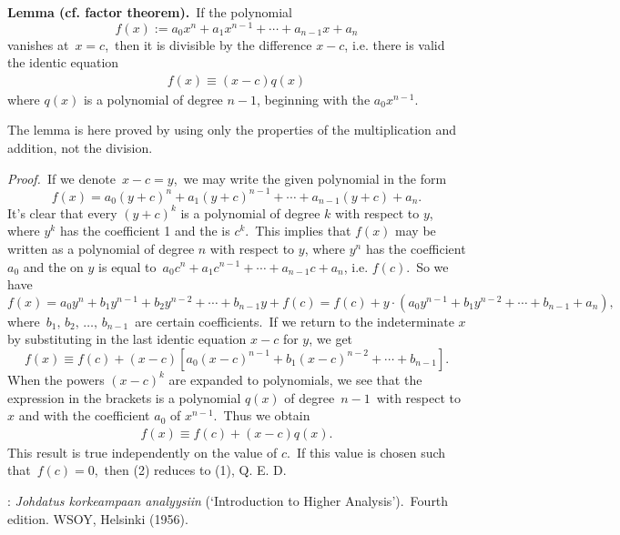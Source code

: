 \documentclass[12pt]{article}
\theoremstyle{definition}
\begin{document}
\textbf{Lemma (cf. factor theorem).}\, If the polynomial 
    $$f(x) := a_0x^n\!+\!a_1x^{n-1}\!+\cdots+\!a_{n-1}x\!+\!a_n$$
vanishes at\, $x = c$,\, then it is divisible by the difference $x\!-\!c$, i.e. there is valid the identic equation
\begin{align}
    f(x) \equiv (x\!-\!c)q(x)
\end{align}
where $q(x)$ is a polynomial of degree $n\!-\!1$, beginning with the  $a_0x^{n-1}$.

The lemma is here proved by using only the properties of the multiplication and addition, not the division.

{\em Proof.}\, If we denote\, $x\!-\!c = y$,\, we may write the given polynomial in the form
$$f(x) = 
a_0(y\!+\!c)^n\!+\!a_1(y\!+\!c)^{n-1}\!+\cdots+\!a_{n-1}(y\!+\!c)\!+\!a_n.$$
It's clear that every $(y\!+\!c)^k$ is a polynomial of degree $k$ with respect to $y$, where $y^k$ has the coefficient 1 and the  is $c^k$.\, This implies that $f(x)$ may be written as a polynomial of degree $n$ with respect to $y$, where $y^n$ has the coefficient $a_0$ and the  on $y$ is equal to\, $ a_0c^n\!+\!a_1c^{n-1}\!+\cdots+\!a_{n-1}c\!+\!a_n$, i.e. $f(c)$.\, So we have
 $$f(x) = a_0y^n\!+\!b_1y^{n-1}\!+\!b_2y^{n-2}\!+\cdots+\!b_{n-1}y\!+f(c)
      = f(c)+y\cdot(a_0y^{n-1}\!+\!b_1y^{n-2}\!+\cdots+\!b_{n-1}\!+\!a_n),$$
where\, $b_1,\,b_2,\,\ldots,\,b_{n-1}$\, are certain coefficients.\, If we return to the indeterminate $x$ by substituting in the last identic equation $x\!-\!c$ for $y$, we get
 $$f(x) \equiv f(c)+(x\!-\!c)[a_0(x\!-\!c)^{n-1}\!+\!b_1(x\!-\!c)^{n-2}\!+\cdots+\!b_{n-1}].$$
When the powers $(x\!-\!c)^k$ are expanded to polynomials, we see that the expression in the brackets is a polynomial $q(x)$ of degree\, $n\!-\!1$\, with respect to $x$ and with the coefficient $a_0$ of $x^{n-1}$.\, Thus we obtain
\begin{align}
   f(x) \equiv f(c)+(x\!-\!c)q(x).
\end{align}
This result is true independently on the value of $c$.\, If this value is chosen such that\, $f(c) = 0$,\, then (2) reduces to (1), Q. E. D.

\begin{thebibliography}{8}
: {\em Johdatus korkeampaan analyysiin} (`Introduction to Higher Analysis').\, Fourth edition. WSOY, Helsinki (1956).
\end{thebibliography}
\end{document}
